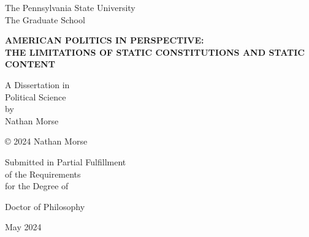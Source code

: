 
\begin{titlepage}
\centering

{\normalsize The Pennsylvania State University\\The Graduate School}

{\large\bfseries AMERICAN POLITICS IN PERSPECTIVE: \\THE LIMITATIONS OF STATIC CONSTITUTIONS AND STATIC CONTENT}

{\normalsize A Dissertation in\\Political Science\\by\\Nathan Morse}

{\small © 2024 Nathan Morse}

{\small Submitted in Partial Fulfillment\\of the Requirements\\for the Degree of}

{\small Doctor of Philosophy}

{\normalsize May 2024}

\end{titlepage}